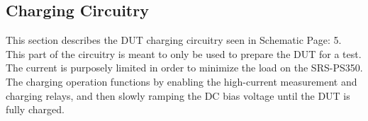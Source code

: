 \subsection{Charging Circuitry}
\label{sec:charging}

This section describes the DUT charging circuitry seen in Schematic Page: 5. This part of the circuitry is meant to only be used to prepare the DUT for a test. The current is purposely limited in order to minimize the load on the SRS-PS350. The charging operation functions by enabling the high-current measurement and charging relays, and then slowly ramping the DC bias voltage until the DUT is fully charged.

